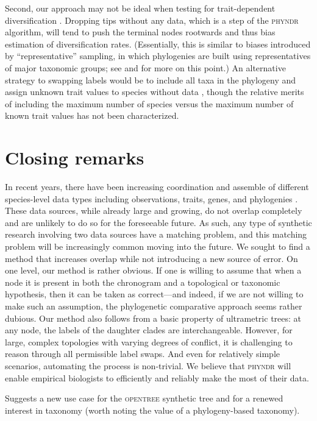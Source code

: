 \documentclass[a4paper,11pt]{article}
\begin{document}
Second, our approach may not be ideal when testing for trait-dependent diversification \citep[e.g.,][]{Maddison2007, FitzJohn2012}. Dropping tips without any data, which is a step of the \textsc{phyndr} algorithm, will tend to push the terminal nodes rootwards and thus bias estimation of diversification rates. (Essentially, this is similar to biases introduced by ``representative'' sampling, in which phylogenies are built using representatives of major taxonomic groups; see \citealt{Hohna2011} and \citealt{Stadler2013} for more on this point.) An alternative strategy to swapping labels would be to include all taxa in the phylogeny and assign unknown trait values to species without data \citep{FitzJohn2009}, though the relative merits of including the maximum number of species versus the maximum number of known trait values has not been characterized.

\section{Closing remarks}

In recent years, there have been increasing coordination and assemble of different species-level data types including observations, traits, genes, and phylogenies \citep{Parr2012}.  These data sources, while already large and growing, do not overlap completely and are unlikely to do so for the foreseeable future.  As such, any type of synthetic research involving two data sources have a matching problem, and this matching problem will be increasingly common moving into the future.  We sought to find a method that increases overlap while not introducing a new source of error.  On one level, our method is rather obvious. If one is willing to assume that when a node it is present in both the chronogram and a topological or taxonomic hypothesis, then it can be taken as correct---and indeed, if we are not willing to make such an assumption, the phylogenetic comparative approach seems rather dubious.  Our method also follows from a basic property of ultrametric trees: at any node, the labels of the daughter clades are interchangeable. However, for large, complex topologies with varying degrees of conflict, it is challenging to reason through all permissible label swaps. And even for relatively simple scenarios, automating the process is non-trivial. We believe that \textsc{phyndr} will enable empirical biologists to efficiently and reliably make the most of their data.

Suggests a new use case for the \textsc{opentree} synthetic tree \citep{OpenTree} and for a renewed interest in taxonomy (worth noting the value of a phylogeny-based taxonomy).
\end{document}
